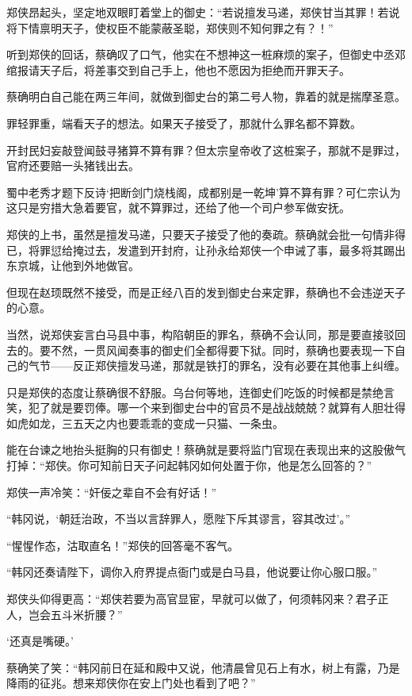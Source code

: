郑侠昂起头，坚定地双眼盯着堂上的御史：“若说擅发马递，郑侠甘当其罪！若说将下情禀明天子，使权臣不能蒙蔽圣聪，郑侠则不知何罪之有？！”

听到郑侠的回话，蔡确叹了口气，他实在不想神这一桩麻烦的案子，但御史中丞邓绾报请天子后，将差事交到自己手上，他也不愿因为拒绝而开罪天子。

蔡确明白自己能在两三年间，就做到御史台的第二号人物，靠着的就是揣摩圣意。

罪轻罪重，端看天子的想法。如果天子接受了，那就什么罪名都不算数。

开封民妇妄敲登闻鼓寻猪算不算有罪？但太宗皇帝收了这桩案子，那就不是罪过，官府还要赔一头猪钱出去。

蜀中老秀才题下反诗‘把断剑门烧栈阁，成都别是一乾坤’算不算有罪？可仁宗认为这只是穷措大急着要官，就不算罪过，还给了他一个司户参军做安抚。

郑侠的上书，虽然是擅发马递，只要天子接受了他的奏疏。蔡确就会批一句情非得已，将罪愆给掩过去，发遣到开封府，让孙永给郑侠一个申诫了事，最多将其踢出东京城，让他到外地做官。

但现在赵顼既然不接受，而是正经八百的发到御史台来定罪，蔡确也不会违逆天子的心意。

当然，说郑侠妄言白马县中事，构陷朝臣的罪名，蔡确不会认同，那是要直接驳回去的。要不然，一贯风闻奏事的御史们全都得要下狱。同时，蔡确也要表现一下自己的气节——反正郑侠擅发马递，那就是铁打的罪名，没有必要在其他事上纠缠。

只是郑侠的态度让蔡确很不舒服。乌台何等地，连御史们吃饭的时候都是禁绝言笑，犯了就是要罚俸。哪一个来到御史台中的官员不是战战兢兢？就算有人胆壮得如虎如龙，三五天之内也要乖乖的变成一只猫、一条虫。

能在台谏之地抬头挺胸的只有御史！蔡确就是要将监门官现在表现出来的这股傲气打掉：“郑侠。你可知前日天子问起韩冈如何处置于你，他是怎么回答的？”

郑侠一声冷笑：“奸佞之辈自不会有好话！”

“韩冈说，‘朝廷治政，不当以言辞罪人，愿陛下斥其谬言，容其改过’。”

“惺惺作态，沽取直名！”郑侠的回答毫不客气。

“韩冈还奏请陛下，调你入府界提点衙门或是白马县，他说要让你心服口服。”

郑侠头仰得更高：“郑侠若要为高官显宦，早就可以做了，何须韩冈来？君子正人，岂会五斗米折腰？”

‘还真是嘴硬。’

蔡确笑了笑：“韩冈前日在延和殿中又说，他清晨曾见石上有水，树上有露，乃是降雨的征兆。想来郑侠你在安上门处也看到了吧？”

